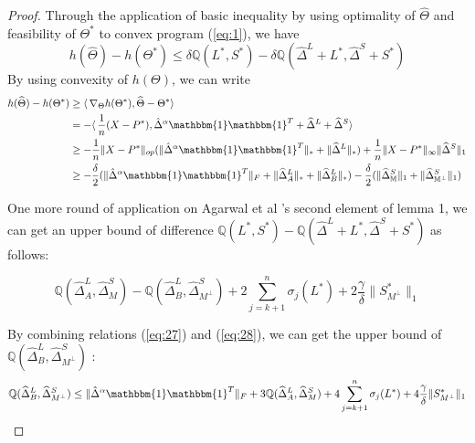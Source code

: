 \documentclass[AMS,STIX1COL]{WileyNJD-v2}
\begin{document}
\begin{proof}
Through the application of basic inequality by using optimality of $\widehat{\Theta}$ and feasibility of $\Theta^{*}$ to convex program (\ref{eq:1}), we have
\begin{equation}
    h(\widehat{\Theta}) - h(\Theta^{*})
    \leq \delta \mathbb{Q}(L^{*},S^{*}) - \delta \mathbb{Q}(\widehat{\Delta}^L + L^{*},\widehat{\Delta}^S + S^{*})
\end{equation}
By using convexity of $h(\Theta)$, we can write
\begin{align}
    h(\widehat{\Theta})-h(\Theta^{*}) &\geq
    \langle\, \nabla_{\Theta}h(\Theta^{*}),\widehat{\Theta}-\Theta^{*}\rangle\ \nonumber \\
    &= - \langle\,\frac{1}{n} (X-P^{*}), \hat{\Delta}^{\alpha}\mathbbm{1}\mathbbm{1}^T + \widehat{\Delta}^{L} + \widehat{\Delta}^{S} \rangle\ \nonumber \\
    &\geq -\frac{1}{n} \|X - P^*\|_{op}(\|\hat{\Delta}^{\alpha}\mathbbm{1}\mathbbm{1}^T\|_\ast + \|\widehat{\Delta}^{L}\|_\ast) +  \frac{1}{n} \|X - P^*\|_{\infty}\|\widehat{\Delta}^{S}\|_{1} \nonumber \\
    &\geq -\frac{\delta}{2}(\|\hat{\Delta}^{\alpha}\mathbbm{1}\mathbbm{1}^T\|_F + \|\widehat{\Delta}^{L}_{A}\|_\ast + \|\widehat{\Delta}^{L}_{B}\|_\ast) - \frac{\delta}{2} (\|\widehat{\Delta}^{S}_{\mathbb{M}}\|_{1} +
    \|\widehat{\Delta}^{S}_{\mathbb{M^\perp}}\|_{1}) \label{eq:27}
\end{align}

One more round of application on Agarwal et al \cite{agarwal2012noisy}'s second element of lemma 1,
we can get an upper bound of difference $\mathbb{Q}(L^*,S^*)- \mathbb{Q}(\widehat{\Delta}^L + L^{*},\widehat{\Delta}^S + S^{*})$ as follows:

\begin{equation} \label{eq:28}
    \mathbb{Q}(\widehat{\Delta}^L_{A},\widehat{\Delta}^S_{M}) - \mathbb{Q}(\widehat{\Delta}^L_{B},\widehat{\Delta}^S_{M^\perp})
    +2 \sum_{j=k+1}^{n} \sigma_{j}(L^*) + 2\frac{\gamma}{\delta}\|S^*_{M^\perp}\|_{1}
\end{equation}

By combining relations (\ref{eq:27}) and (\ref{eq:28}), we can get the upper bound of $\mathbb{Q}(\widehat{\Delta}^L_{B},\widehat{\Delta}^S_{M^\perp})$ :
\begin{align*}
    \mathbb{Q}(\widehat{\Delta}^L_{B},\widehat{\Delta}^S_{M^\perp}) \leq
    \|\hat{\Delta}^{\alpha}\mathbbm{1}\mathbbm{1}^T\|_{F} +
    3\mathbb{Q}(\widehat{\Delta}^{L}_{A},\widehat{\Delta}^{S}_{M})+4 \sum_{j=k+1}^{n} \sigma_{j}(L^{*}) + 4\frac{\gamma}{\delta}
    \|S^{*}_{M^\perp}\|_{1}
\end{align*}



\end{proof}
\end{document}
